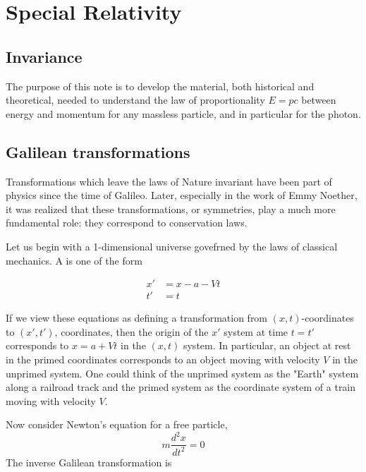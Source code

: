 

\setcounter{section}{13}


\section{Special Relativity}

\innertableofcontents

\subsection{Invariance}

The purpose of this note is to develop the material,
both historical and theoretical, needed to understand
the law of proportionality $E = pc$ between energy
and momentum for any massless particle, and in particular
for the photon.

\subsection{Galilean transformations}

Transformations which leave the laws of Nature
invariant have been part of physics since the time
of Galileo.  Later, especially in the work of Emmy Noether,
it was realized that these transformations,
or symmetries, play a much more fundamental role: they
correspond to conservation laws.

Let us begin with a 1-dimensional universe govefrned
by  the laws of classical mechanics.  A 
is one of the form

\begin{align}
  x' &= x - a - Vt \\
  t' &= t
\end{align}

If we view these equations as defining a transformation
from $(x,t)$-coordinates to $(x',t')$, coordinates, then the
origin of the $x'$ system at time $t = t'$ corresponds to
$x = a + Vt$ in the $(x,t)$ system.  In particular, an object
at rest in the primed coordinates corresponds to an object
moving with velocity $V$ in the unprimed system.  One
could think of the unprimed system as the "Earth" system
along a railroad track and the primed system as the
coordinate system of a train moving with velocity $V$.

Now consider Newton's equation for a free particle,
\[
    m\frac{d^2x}{dt^2} = 0
\]
The inverse Galilean transformation is

